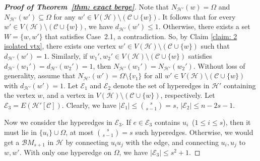 \documentclass[11pt]{article}
\numberwithin{equation}{section}
\newcommand\cB{{\mathcal B}}
\newcommand\cC{{\mathcal C}}
\newcommand\cE{{\mathcal E}}
\newcommand\cH{{\mathcal H}}
\begin{document}
\begin{proof}[\bf Proof of Theorem~\ref{thm: exact berge}]

    Note that $N_{\cH'}(w) = \Omega$ and $N_{\cH'}(w') \subseteq \Omega$ for any $w' \in V(\cH)\setminus (\cC \cup \{w\})$. It follows that for every $w' \in V(\cH)\setminus (\cC \cup \{w\})$, we have $d_{\cH'}(w') \le 1$.
    Otherwise, there exists a set $W=\{w,w'\}$ that satisfies Case~2.1, a contradiction.
    So, by Claim \ref{claim: 2 isolated vtx}, there exists one vertex $w'\in V(\cH)\setminus \left(\cC \cup\{w\}\right)$ such that $d_{\cH'}(w')=1$.
    Similarly, if $w_1',w_2' \in V(\cH)\setminus (\cC \cup \{w\})$ satisfies $d_{\cH'}(w_1') = d_{\cH'}(w_2') = 1$,
    then $N_{\cH'}(w_1') = N_{\cH'}(w_2')$.
    Without loss of generality, assume that $N_{\cH'}(w') = \Omega\setminus \{v_1\}$ for all $w' \in V(\cH)\setminus (\cC \cup \{w\})$ with $d_{\cH'}(w') = 1$.
        Let $\cE_{1}$ and $\cE_{2}$ denote the set of  hyperedges in $\cH'$ containing the vertex $w$, and a vertex in $V(\cH)\setminus (\cC \cup \{w\})$, respectively. Let $\cE_{3}=E(\cH'[\cC])$.
Clearly, we have $|\cE_1| \le \binom{s}{s-1} = s $, $|\cE_2| \le n-2s-1$.

Now we consider the hyperedges in $\cE_{3}$.
If $e \in \cE_{3}$ contains $u_i$~($1 \le i \le s$), then it must lie in $\{u_i\}\cup \Omega$, at most $\binom{s}{s-1} = s$ such hyperedges. Otherwise, we would get a $\cB M_{s+1}$ in $\cH$ by connecting $u_iu_j$ with the edge, and connecting $u_i,u_j$ to $w,w'$.
With only one hyperedge on $\Omega$, we have $|\cE_3| \le s^2+1$.






\end{proof}
\end{document}
